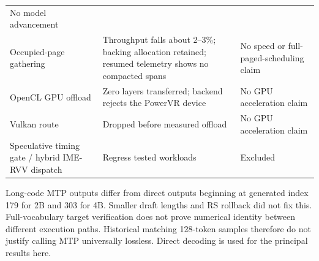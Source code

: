 \documentclass[10pt,a4paper]{article}
\begin{document}
\begin{longtable}[]{@{}lll@{}}
\begin{minipage}[t]{0.30\columnwidth}
No model advancement\strut
\end{minipage}\tabularnewline
\begin{minipage}[t]{0.30\columnwidth}\raggedright
Occupied-page gathering\strut
\end{minipage} & \begin{minipage}[t]{0.30\columnwidth}\raggedright
Throughput falls about 2--3\%; backing allocation retained; resumed
telemetry shows no compacted spans\strut
\end{minipage} & \begin{minipage}[t]{0.30\columnwidth}\raggedright
No speed or full-paged-scheduling claim\strut
\end{minipage}\tabularnewline
\begin{minipage}[t]{0.30\columnwidth}\raggedright
OpenCL GPU offload\strut
\end{minipage} & \begin{minipage}[t]{0.30\columnwidth}\raggedright
Zero layers transferred; backend rejects the PowerVR device\strut
\end{minipage} & \begin{minipage}[t]{0.30\columnwidth}\raggedright
No GPU acceleration claim\strut
\end{minipage}\tabularnewline
\begin{minipage}[t]{0.30\columnwidth}\raggedright
Vulkan route\strut
\end{minipage} & \begin{minipage}[t]{0.30\columnwidth}\raggedright
Dropped before measured offload\strut
\end{minipage} & \begin{minipage}[t]{0.30\columnwidth}\raggedright
No GPU acceleration claim\strut
\end{minipage}\tabularnewline
\begin{minipage}[t]{0.30\columnwidth}\raggedright
Speculative timing gate / hybrid IME-RVV dispatch\strut
\end{minipage} & \begin{minipage}[t]{0.30\columnwidth}\raggedright
Regress tested workloads\strut
\end{minipage} & \begin{minipage}[t]{0.30\columnwidth}\raggedright
Excluded\strut
\end{minipage}\tabularnewline
\bottomrule
\end{longtable}

Long-code MTP outputs differ from direct outputs beginning at generated
index 179 for 2B and 303 for 4B. Smaller draft lengths and RS rollback
did not fix this. Full-vocabulary target verification does not prove
numerical identity between different execution paths. Historical
matching 128-token samples therefore do not justify calling MTP
universally lossless. Direct decoding is used for the principal results
here.
\end{document}
